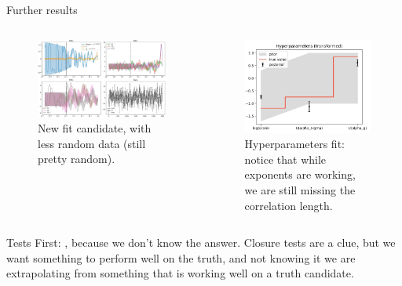 \documentclass[9pt]{beamer}
\begin{document}
\begin{frame}{Further results}
    \vspace*{30pt}
    \begin{columns}
        \begin{column}{0.6\textwidth}
            \begin{figure}
                \centering
                \includegraphics[width=\textwidth]{fit-pdf-new}
                \caption{
                    New fit candidate, with less random data (still pretty
                    random).
                }
            \end{figure} 
        \end{column}
        \begin{column}{0.4\textwidth}
            \begin{figure}
                \centering
                \includegraphics[width=\textwidth]{fit-hyper-new}
                \caption{
                    Hyperparameters fit: notice that while exponents are
                    working, we are still missing the correlation length.
                }
            \end{figure} 
        \end{column}
    \end{columns}
\end{frame}

\begin{frame}{Tests}
    First: , because we don't know the answer. Closure
    tests are a clue, but we want something to perform well on the truth, and
    not knowing it we are extrapolating from something that is working well on
    a truth candidate.
\end{frame}
\end{document}

